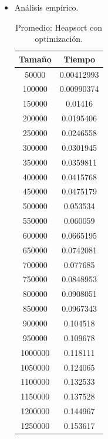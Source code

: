 \documentclass[a4paper,12pt,twoside]{article} %
\begin{document}
\begin{itemize}
	
	\item Análisis empírico.
\begin{table}[h]
	\begin{center}
		\begin{tabular}{|c|c|}
		\hline
		Tamaño & Tiempo \\
		\hline
		50000 & 0.00412993 \\
		100000 & 0.00990374 \\
		150000 & 0.01416 \\
		200000 & 0.0195406 \\
		250000 & 0.0246558 \\
		300000 & 0.0301945 \\
		350000 & 0.0359811 \\
		400000 & 0.0415768 \\
		450000 & 0.0475179 \\
		500000 & 0.053534 \\
		550000 & 0.060059 \\
		600000 & 0.0665195 \\
		650000 & 0.0742081 \\
		700000 & 0.077685 \\
		750000 & 0.0848953 \\
		800000 & 0.0908051 \\
		850000 & 0.0967343 \\
		900000 & 0.104518 \\
		950000 & 0.109678 \\
		1000000 & 0.118111 \\
		1050000 & 0.124065 \\
		1100000 & 0.132533 \\
		1150000 & 0.137528 \\
		1200000 & 0.144967 \\
		1250000 &0.153617 \\

		\hline
		\end{tabular}
	\end{center}
	\caption{Promedio: Heapsort con optimización.}
\end{table}
\newpage

\begin{figure}[h]
  \begin{center}
  

\end{center}
\end{figure}
\end{itemize}
\end{document}
